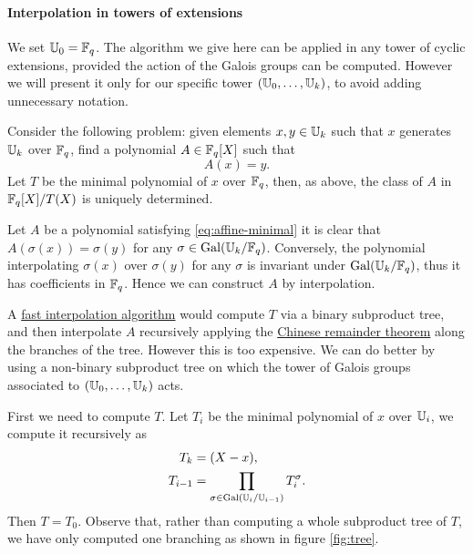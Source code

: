 \paragraph{Interpolation in towers of extensions}
We set $\mathbb{U}_0=\mathbb{F}_q$. The algorithm we give here can be applied in any
tower of cyclic extensions, provided the action of the Galois groups
can be computed. However we will present it only for our specific
tower $(\mathbb{U}_0,\dots,\mathbb{U}_k)$, to avoid adding unnecessary notation.

Consider the following problem: given elements $x,y\in\mathbb{U}_k$ such that
$x$ generates $\mathbb{U}_k$ over $\mathbb{F}_q$, find a polynomial $A\in\mathbb{F}_q[X]$ such
that
\begin{equation}
  \label{eq:affine-minimal}
  A(x) = y
  \text{.}
\end{equation}
Let $T$ be the minimal polynomial of $x$ over $\mathbb{F}_q$, then, as above,
the class of $A$ in $\mathbb{F}_q[X]/T(X)$ is uniquely determined.

Let $A$ be a polynomial satisfying \eqref{eq:affine-minimal} it is
clear that $A(\sigma(x)) = \sigma(y)$ for any
$\sigma\in\operatorname{Gal}(\mathbb{U}_k/\mathbb{F}_q)$. Conversely, the polynomial interpolating
$\sigma(x)$ over $\sigma(y)$ for any $\sigma$ is invariant under
$\operatorname{Gal}(\mathbb{U}_k/\mathbb{F}_q)$, thus it has coefficients in $\mathbb{F}_q$. Hence we can
construct $A$ by interpolation.

A \hyperref[sec:chin-rema-algor]{fast interpolation algorithm} would
compute $T$ via a binary subproduct tree, and then interpolate $A$
recursively applying the \hyperref[th:chinese-remainder]{Chinese
  remainder theorem} along the branches of the tree. However this is
too expensive. We can do better by using a non-binary subproduct tree
on which the tower of Galois groups associated to $(\mathbb{U}_0,\ldots,\mathbb{U}_k)$
acts.

First we need to compute $T$. Let $T_i$ be the minimal polynomial of
$x$ over $\mathbb{U}_i$, we compute it recursively as
\begin{align}
  T_k &= (X - x)\text{,}\\
  \label{eq:minprod}
  T_{i-1} &= \prod_{\sigma\in\operatorname{Gal}(\mathbb{U}_{i}/\mathbb{U}_{i-1})}T_{i}^\sigma\text{.}
\end{align}
Then $T=T_0$. Observe that, rather than computing a whole subproduct
tree of $T$, we have only computed one branching as shown in figure
\ref{fig:tree}.


